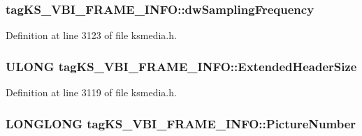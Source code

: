 \subsubsection[{\texorpdfstring{dw\+Sampling\+Frequency}{dwSamplingFrequency}}]{ tag\+K\+S\+\_\+\+V\+B\+I\+\_\+\+F\+R\+A\+M\+E\+\_\+\+I\+N\+F\+O\+::dw\+Sampling\+Frequency}\hypertarget{structtag_k_s___v_b_i___f_r_a_m_e___i_n_f_o_a2c58c23989c86a6e983da1deb54c607a}{}\label{structtag_k_s___v_b_i___f_r_a_m_e___i_n_f_o_a2c58c23989c86a6e983da1deb54c607a}


Definition at line 3123 of file ksmedia.\+h.

\subsubsection[{\texorpdfstring{Extended\+Header\+Size}{ExtendedHeaderSize}}]{\setlength{\rightskip}{0pt plus 5cm}U\+L\+O\+NG tag\+K\+S\+\_\+\+V\+B\+I\+\_\+\+F\+R\+A\+M\+E\+\_\+\+I\+N\+F\+O\+::\+Extended\+Header\+Size}\hypertarget{structtag_k_s___v_b_i___f_r_a_m_e___i_n_f_o_a42566ef5e7c61900b52aeed3ca15149b}{}\label{structtag_k_s___v_b_i___f_r_a_m_e___i_n_f_o_a42566ef5e7c61900b52aeed3ca15149b}


Definition at line 3119 of file ksmedia.\+h.

\subsubsection[{\texorpdfstring{Picture\+Number}{PictureNumber}}]{\setlength{\rightskip}{0pt plus 5cm}L\+O\+N\+G\+L\+O\+NG tag\+K\+S\+\_\+\+V\+B\+I\+\_\+\+F\+R\+A\+M\+E\+\_\+\+I\+N\+F\+O\+::\+Picture\+Number}\hypertarget{structtag_k_s___v_b_i___f_r_a_m_e___i_n_f_o_a0aa01468b10fe93640baeaa8ee391cab}{}\label{structtag_k_s___v_b_i___f_r_a_m_e___i_n_f_o_a0aa01468b10fe93640baeaa8ee391cab}


